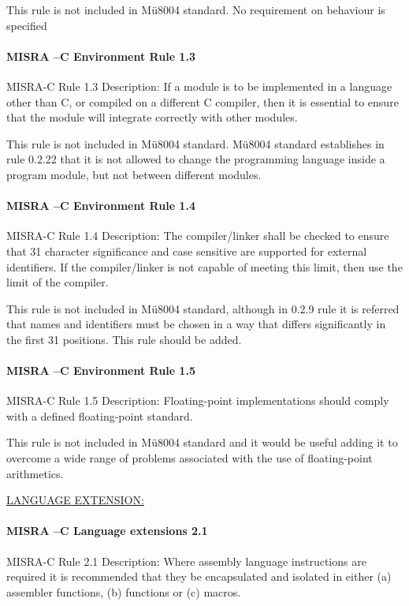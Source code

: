 This rule is not included in Mü8004 standard. No requirement on behaviour is specified

\paragraph{MISRA –C Environment Rule 1.3}
MISRA-C Rule 1.3 Description: If a module is to be implemented in a language other than C, or compiled on a different C compiler, then it is essential to ensure that the module will integrate correctly with other modules.

This rule is not included in Mü8004 standard. Mü8004 standard establishes in rule 0.2.22 that it is not allowed to change the programming language inside a program module, but not between different modules.

\paragraph{MISRA –C Environment Rule 1.4}
MISRA-C Rule 1.4 Description: The compiler/linker shall be checked to ensure that 31 character significance and case sensitive are supported for external identifiers. If the compiler/linker is not capable of meeting this limit, then use the limit of the compiler.

This rule is not included in Mü8004 standard, although in 0.2.9 rule it is referred that names and identifiers must be chosen in a way that differs significantly in the first 31 positions. This rule should be added.

\paragraph{MISRA –C Environment Rule 1.5}
MISRA-C Rule 1.5 Description: Floating-point implementations should comply with a defined floating-point standard.

This rule is not included in Mü8004 standard and it would be useful adding it to overcome a wide range of problems associated with the use of floating-point arithmetics.

\begin{center}
\textsc{\underline{LANGUAGE EXTENSION:}}
\end{center}

\paragraph{MISRA –C Language extensions 2.1}
MISRA-C Rule 2.1 Description: Where assembly language instructions are required it is recommended that they be encapsulated and isolated in either (a) assembler functions, (b) functions or (c) macros.

